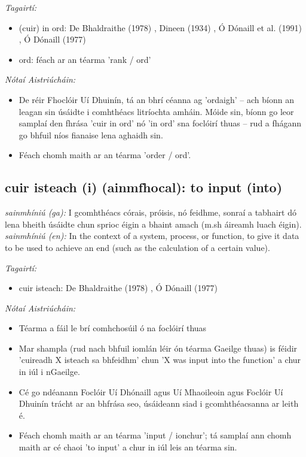 \documentclass{article}
\begin{document}
 \noindent \textit{Tagairtí:}
\begin{itemize}
	\item (cuir) in ord: De Bhaldraithe (1978) \cite{de-bhaldraithe}, Dineen (1934) \cite{dineen}, Ó Dónaill et al. (1991) \cite{focloir-beag}, Ó Dónaill (1977) \cite{odonaill}
	\item ord: féach ar an téarma 'rank / ord'
\end{itemize}

 \noindent \textit{Nótaí Aistriúcháin:}
\begin{itemize}
	\item De réir Fhoclóir Uí Dhuinín, tá an bhrí céanna ag 'ordaigh' -- ach bíonn an leagan sin úsáidte i comhthéacs litríochta amháin. Móide sin, bíonn go leor samplaí den fhrása 'cuir in ord' nó 'in ord' sna foclóirí thuas -- rud a fhágann go bhfuil níos fianaise lena aghaidh sin.
	\item Féach chomh maith ar an téarma 'order / ord'.
\end{itemize}


\subsection*{cuir isteach (i) (ainmfhocal): to input (into)} 
 \noindent \textit{sainmhíniú (ga):} I gcomhthéacs córais, próisis, nó feidhme, sonraí a tabhairt dó lena bheith úsáidte chun sprioc éigin a bhaint amach (m.sh áireamh luach éigin).
\newline\newline
 \noindent \textit{sainmhíniú (en):} In the context of a system, process, or function, to give it data to be used to achieve an end (such as the calculation of a certain value).
\newline

 \noindent \textit{Tagairtí:}
\begin{itemize}
	\item cuir isteach: De Bhaldraithe (1978) \cite{de-bhaldraithe}, Ó Dónaill (1977) \cite{odonaill}
\end{itemize}

 \noindent \textit{Nótaí Aistriúcháin:}
\begin{itemize}
	\item Téarma a fáil le brí comhchosúil ó na foclóirí thuas
	\item Mar shampla (rud nach bhfuil iomlán léir ón téarma Gaeilge thuas) is féidir 'cuireadh X isteach sa bhfeidhm' chun 'X was input into the function' a chur in iúl i nGaeilge.
	\item Cé go ndéanann Foclóir Uí Dhónaill agus Uí Mhaoileoin agus Foclóir Uí Dhuinín trácht ar an bhfrása seo, úsáideann siad i gcomhthéacsanna ar leith é.
	\item Féach chomh maith ar an téarma 'input / ionchur'; tá samplaí ann chomh maith ar cé chaoi 'to input' a chur in iúl leis an téarma sin.
\end{itemize}
\end{document}
